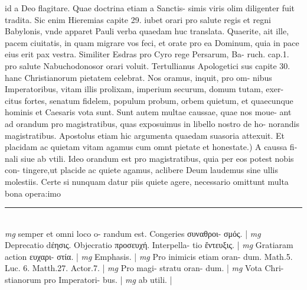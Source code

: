 \documentclass{article}
\begin{document}
\begin{pages}
id a Deo flagitare. Quae doctrina etiam a Sanctis- simis viris olim diligenter fuit tradita. Sic enim Hieremias capite 29. iubet orari pro salute regis et regni Babylonis, vnde apparet Pauli verba quaedam huc translata. Quaerite, ait ille, pacem ciuitatis, in quam migrare vos feci, et orate pro ea Dominum, quia in pace eius erit pax vestra. Similiter Esdras pro Cyro rege Persarum, Ba- ruch. cap.1. pro salute Nabuchodonosor orari voluit. Tertullianus Apologetici sus capite 30. hanc Christianorum pietatem celebrat. Nos oramus, inquit, pro om- nibus Imperatoribus, vitam illis prolixam, imperium securum, domum tutam, exer- citus fortes, senatum fidelem, populum probum, orbem quietum, et quaecunque hominis et Caesaris vota sunt. Sunt autem multae caussae, quae nos moue- ant ad orandum pro magistratibus, quas exposuimus in libello nostro de ho- norandis magistratibus. Apostolus etiam hic argumenta quaedam suasoria attexuit. Et placidam ac quietam vitam agamus cum omnt pietate et honestate.) A caussa fi- nali siue ab vtili. Ideo orandum est pro magistratibus, quia per eos potest nobis con- tingere,ut placide ac quiete agamus, aclibere Deum laudemus sine ullis molestiis. Certe si nunquam datur piis quiete agere, necessario omittunt multa bona opera:imo  \pend
\vspace{0.5cm}\noindent
\vspace{0.2cm}\rule{1cm}{0.2pt}\\ 
\hspace{0.2cm}\textit{mg}
\footnotesize semper et omni loco o- randum est. Congeries συναθροι- σμός. 
\normalsize| 
\hspace{0.2cm}\textit{mg}
\footnotesize Deprecatio dέησις. Objecratio προσευχή. Interpella- tio ἔντευξις. 
\normalsize| 
\hspace{0.2cm}\textit{mg}
\footnotesize Gratiaram action ευχαρι- στία. 
\normalsize| 
\hspace{0.2cm}\textit{mg}
\footnotesize Emphasis. 
\normalsize| 
\hspace{0.2cm}\textit{mg}
\footnotesize Pro inimicis etiam oran- dum. Math.5. Luc. 6. Matth.27. Actor.7. 
\normalsize| 
\hspace{0.2cm}\textit{mg}
\footnotesize Pro magi- stratu oran- dum. 
\normalsize| 
\hspace{0.2cm}\textit{mg}
\footnotesize Vota Chri- stianorum pro Imperatori- bus. 
\normalsize| 
\hspace{0.2cm}\textit{mg}
\footnotesize ab utili. 
\normalsize| 

\end{pages}
\end{document}
